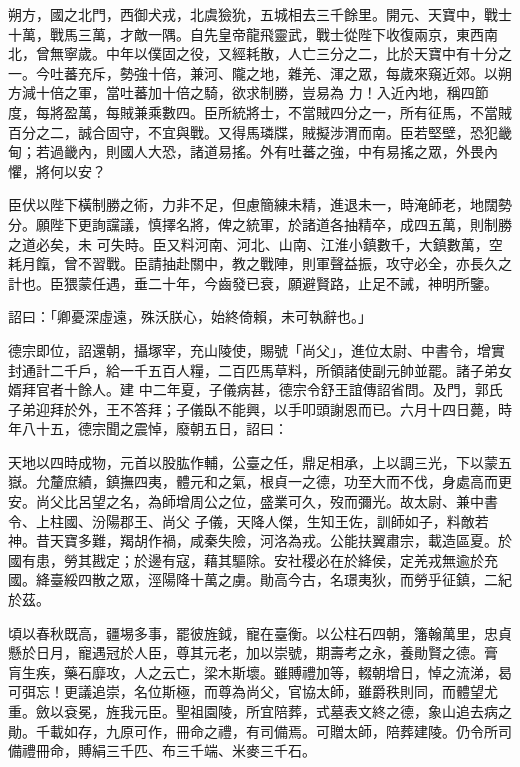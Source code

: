 \begin{pinyinscope}
 朔方，國之北門，西御犬戎，北虞獫狁，五城相去三千餘里。開元、天寶中，戰士十萬，戰馬三萬，才敵一隅。自先皇帝龍飛靈武，戰士從陛下收復兩京，東西南北，曾無寧歲。中年以僕固之役，又經耗散，人亡三分之二，比於天寶中有十分之一。今吐蕃充斥，勢強十倍，兼河、隴之地，雜羌、渾之眾，每歲來窺近郊。以朔方減十倍之軍，當吐蕃加十倍之騎，欲求制勝，豈易為
 力！入近內地，稱四節度，每將盈萬，每賊兼乘數四。臣所統將士，不當賊四分之一，所有征馬，不當賊百分之二，誠合固守，不宜與戰。又得馬璘牒，賊擬涉渭而南。臣若堅壁，恐犯畿甸；若過畿內，則國人大恐，諸道易搖。外有吐蕃之強，中有易搖之眾，外畏內懼，將何以安？



 臣伏以陛下橫制勝之術，力非不足，但慮簡練未精，進退未一，時淹師老，地闊勢分。願陛下更詢讜議，慎擇名將，俾之統軍，於諸道各抽精卒，成四五萬，則制勝之道必矣，未
 可失時。臣又料河南、河北、山南、江淮小鎮數千，大鎮數萬，空耗月餼，曾不習戰。臣請抽赴關中，教之戰陣，則軍聲益振，攻守必全，亦長久之計也。臣猥蒙任遇，垂二十年，今齒發已衰，願避賢路，止足不誡，神明所鑒。



 詔曰：「卿憂深虛遠，殊沃朕心，始終倚賴，未可執辭也。」



 德宗即位，詔還朝，攝塚宰，充山陵使，賜號「尚父」，進位太尉、中書令，增實封通計二千戶，給一千五百人糧，二百匹馬草料，所領諸使副元帥並罷。諸子弟女婿拜官者十餘人。建
 中二年夏，子儀病甚，德宗令舒王誼傳詔省問。及門，郭氏子弟迎拜於外，王不答拜；子儀臥不能興，以手叩頭謝恩而已。六月十四日薨，時年八十五，德宗聞之震悼，廢朝五日，詔曰：



 天地以四時成物，元首以股肱作輔，公臺之任，鼎足相承，上以調三光，下以蒙五嶽。允釐庶績，鎮撫四夷，體元和之氣，根貞一之德，功至大而不伐，身處高而更安。尚父比呂望之名，為師增周公之位，盛業可久，歿而彌光。故太尉、兼中書令、上柱國、汾陽郡王、尚父
 子儀，天降人傑，生知王佐，訓師如子，料敵若神。昔天寶多難，羯胡作禍，咸秦失險，河洛為戎。公能扶翼肅宗，載造區夏。於國有患，勞其戡定；於邊有寇，藉其驅除。安社稷必在於絳侯，定羌戎無逾於充國。絳臺綏四散之眾，涇陽降十萬之虜。勛高今古，名璟夷狄，而勞乎征鎮，二紀於茲。



 頃以春秋既高，疆埸多事，罷彼旌鉞，寵在臺衡。以公柱石四朝，籓翰萬里，忠貞懸於日月，寵遇冠於人臣，尊其元老，加以崇號，期壽考之永，養勛賢之德。膏
 肓生疾，藥石靡攻，人之云亡，梁木斯壞。雖賻禮加等，輟朝增日，悼之流涕，曷可弭忘！更議追崇，名位斯極，而尊為尚父，官協太師，雖爵秩則同，而體望尤重。斂以袞冕，旌我元臣。聖祖園陵，所宜陪葬，式墓表文終之德，象山追去病之勛。千載如存，九原可作，冊命之禮，有司備焉。可贈太師，陪葬建陵。仍令所司備禮冊命，賻絹三千匹、布三千端、米麥三千石。




\end{pinyinscope}
